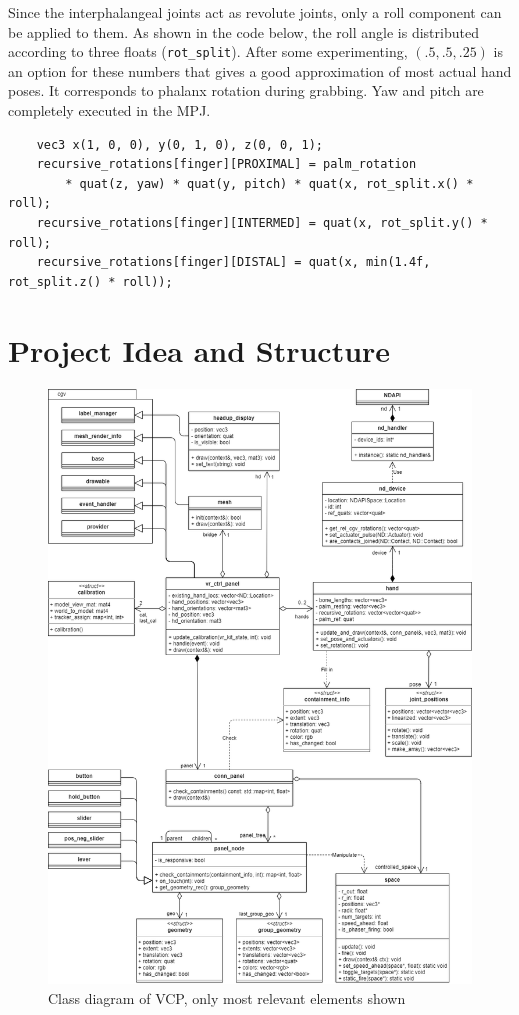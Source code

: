 \documentclass[hyperref, bachelorofscience]{cgvpub}
\begin{document}
Since the interphalangeal joints act as revolute joints, only a roll component can be applied to them. As shown in the code below, the roll angle is distributed according to three floats (\lstinline|rot_split|). After some experimenting, $ (.5, .5, .25) $ is an option for these numbers that gives a good approximation of most actual hand poses. It corresponds to phalanx rotation during grabbing. Yaw and pitch are completely executed in the \gls{MPJ}. 
\begin{lstlisting}
	vec3 x(1, 0, 0), y(0, 1, 0), z(0, 0, 1);
	recursive_rotations[finger][PROXIMAL] = palm_rotation
		* quat(z, yaw) * quat(y, pitch) * quat(x, rot_split.x() * roll);
	recursive_rotations[finger][INTERMED] = quat(x, rot_split.y() * roll);
	recursive_rotations[finger][DISTAL] = quat(x, min(1.4f, rot_split.z() * roll));
\end{lstlisting}

\section{Project Idea and Structure}
\begin{figure}
	\includegraphics[width=\linewidth]{../pics/uml}
	\caption[Class diagram of \gls{VCP}]{Class diagram of \gls{VCP}, only most relevant elements shown}
	\label{fig:uml}
\end{figure}
\end{document}
